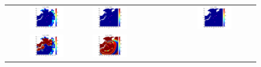 \begin{figure}[h]
\begin{tabular}{clc}
 \hspace*{-65pt}
\includegraphics[width=0.45\textwidth]{./figures/T12d1.pdf} &
\hspace*{-65pt}
\includegraphics[width=0.45\textwidth]{./figures/T12d3.pdf} &
\hspace*{-65pt}
\includegraphics[width=0.45\textwidth]{./figures/T12d4.pdf} \\
\hspace*{-65pt}
\includegraphics[width=0.45\textwidth]{./figures/T22d1.pdf} &
\hspace*{-65pt}
\includegraphics[width=0.45\textwidth]{./figures/T22d3.pdf} &

\end{tabular}
\end{figure}
